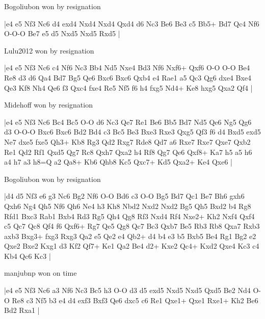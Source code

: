 \showboard

Bogoliubon won by resignation

\makegametitle
|e4 e5 Nf3 Nc6 d4 exd4 Nxd4 Nxd4 Qxd4 d6 Nc3 Be6 Be3 c5 Bb5+ Bd7 Qc4 Nf6 O-O-O Be7 e5 d5 Nxd5 Nxd5 Rxd5  |

\showboard

Lulu2012 won by resignation

\makegametitle
|e4 e5 Nf3 Nc6 c4 Nf6 Nc3 Bb4 Nd5 Nxe4 Bd3 Nf6 Nxf6+ Qxf6 O-O O-O Be4 Re8 d3 d6 Qa4 Bd7 Bg5 Qe6 Bxc6 Bxc6 Qxb4 e4 Rae1 a5 Qc3 Qg6 dxe4 Bxe4 Qe3 Kf8 Nh4 Qe6 f3 Qxc4 fxe4 Re5 Nf5 f6 h4 fxg5 Nd4+ Ke8 hxg5 Qxa2 Qf4  |

\showboard

Midehoff won by resignation

\makegametitle
|e4 e5 Nf3 Nc6 Bc4 Bc5 O-O d6 Nc3 Qe7 Re1 Be6 Bb5 Bd7 Nd5 Qe6 Ng5 Qg6 d3 O-O-O Bxc6 Bxc6 Bd2 Bd4 c3 Bc5 Be3 Bxe3 Rxe3 Qxg5 Qf3 f6 d4 Bxd5 exd5 Ne7 dxe5 fxe5 Qh3+ Kb8 Rg3 Qd2 Rxg7 Rde8 Qd7 a6 Rxe7 Rxe7 Qxe7 Qxb2 Re1 Qd2 Rf1 Qxd5 Qg7 Rc8 Qxh7 Qxa2 h4 Rf8 Qg7 Qe6 Qxf8+ Ka7 h5 a5 h6 a4 h7 a3 h8=Q a2 Qa8+ Kb6 Qhb8 Kc5 Qxc7+ Kd5 Qxa2+ Ke4 Qxe6  |

\showboard

Bogoliubon won by resignation

\makegametitle
|d4 d5 Nf3 e6 g3 Nc6 Bg2 Nf6 O-O Bd6 c3 O-O Bg5 Bd7 Qc1 Be7 Bh6 gxh6 Qxh6 Ng4 Qh5 Nf6 Qh6 Ne4 h3 Kh8 Nbd2 Nxd2 Nxd2 Bg5 Qh5 Bxd2 b4 Rg8 Rfd1 Bxc3 Rab1 Bxb4 Rd3 Rg5 Qh4 Qg8 Rf3 Nxd4 Rf4 Nxe2+ Kh2 Nxf4 Qxf4 c5 Qc7 Qc8 Qf4 f6 Qxf6+ Rg7 Qe5 Qg8 Qc7 Bc3 Qxb7 Be5 Rb3 Rb8 Qxa7 Rxb3 axb3 Bxg3+ fxg3 Rxg3 Qa2 e5 Qe2 e4 Qb2+ d4 b4 e3 b5 Bxb5 Be4 Rg1 Bg2 e2 Qxe2 Bxe2 Kxg1 d3 Kf2 Qf7+ Ke1 Qa2 Be4 d2+ Kxe2 Qc4+ Kxd2 Qxe4 Kc3 c4 Kb4 Qc6 Kc3  |

\showboard

manjubnp won on time

\makegametitle
|e4 e5 Nf3 Nc6 a3 Nf6 Nc3 Bc5 h3 O-O d3 d5 exd5 Nxd5 Nxd5 Qxd5 Be2 Nd4 O-O Re8 c3 Nf5 b3 e4 d4 exf3 Bxf3 Qe6 dxc5 c6 Re1 Qxe1+ Qxe1 Rxe1+ Kh2 Be6 Bd2 Rxa1  |

\showboard

